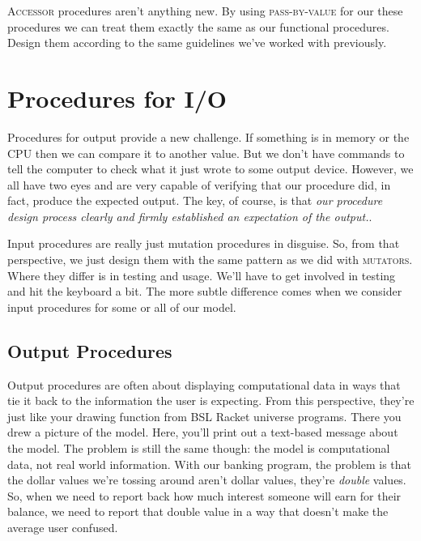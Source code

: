 \documentclass[]{tufte-handout}
\begin{document}
\textsc{Accessor} procedures aren't anything new. By using \textsc{pass-by-value} for our these procedures we can treat them exactly the same as our functional procedures. Design them according to the same guidelines we've worked with previously. 

\section{Procedures for I/O}

Procedures for output provide a new challenge. If something is in memory or the CPU then we can compare it to another value. But we don't have commands to tell the computer to check what it just wrote to some output device.  However, we all have two eyes and are very capable of verifying that our procedure did, in fact, produce the expected output. The key, of course, is that \textit{our procedure design process clearly and firmly established an expectation of the output.}.

Input procedures are really just mutation procedures in disguise. So, from that perspective, we just design them with the same pattern as we did with \textsc{mutators}.  Where they differ is in testing and usage.  We'll have to get involved in testing and hit the keyboard a bit. The more subtle difference comes when we consider input procedures for some or all of our model. 

\subsection{Output Procedures}

Output procedures are often about displaying computational data in ways that tie it back to the information the user is expecting. From this perspective, they're just like your drawing function from BSL Racket universe programs. There you drew a picture of the model. Here, you'll print out a text-based message about the model. The problem is still the same though: the model is computational data, not real world information. With our banking program, the problem is that the dollar values we're tossing around aren't dollar values, they're \textit{double} values. So, when we need to report back how much interest someone will earn for their balance, we need to report that double value in a way that doesn't make the average user confused.
\end{document}
